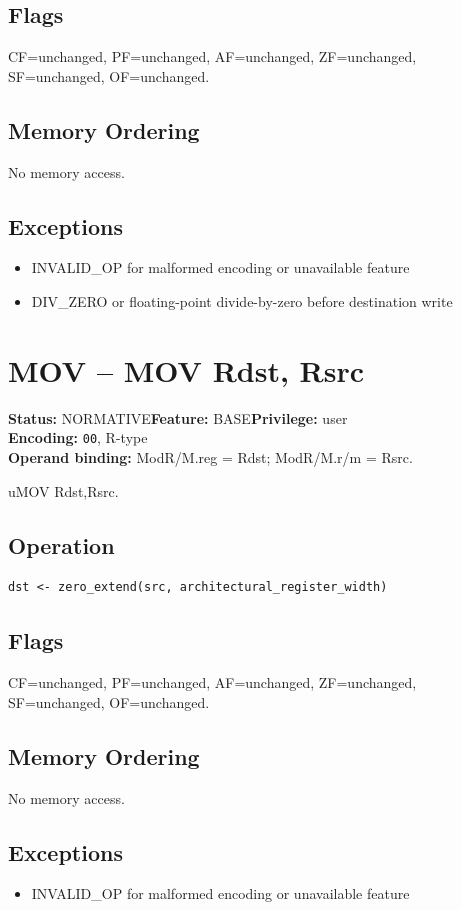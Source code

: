 \documentclass[10pt]{article}
\begin{document}
\subsection*{Flags}
CF=unchanged, PF=unchanged, AF=unchanged, ZF=unchanged, SF=unchanged, OF=unchanged.
\subsection*{Memory Ordering}
No memory access.
\subsection*{Exceptions}
\begin{itemize}
\item INVALID\_OP for malformed encoding or unavailable feature
\item DIV\_ZERO or floating-point divide-by-zero before destination write
\end{itemize}
\clearpage

\section{MOV -- MOV Rdst, Rsrc}
\textbf{Status:} NORMATIVE\quad \textbf{Feature:} BASE\quad \textbf{Privilege:} user\\
\textbf{Encoding:} \texttt{00}, R-type\\
\textbf{Operand binding:} ModR/M.reg = Rdst; ModR/M.r/m = Rsrc.

uMOV Rdst,Rsrc.

\subsection*{Operation}
\begin{lstlisting}
dst <- zero_extend(src, architectural_register_width)
\end{lstlisting}
\subsection*{Flags}
CF=unchanged, PF=unchanged, AF=unchanged, ZF=unchanged, SF=unchanged, OF=unchanged.
\subsection*{Memory Ordering}
No memory access.
\subsection*{Exceptions}
\begin{itemize}
\item INVALID\_OP for malformed encoding or unavailable feature
\end{itemize}
\clearpage
\end{document}
